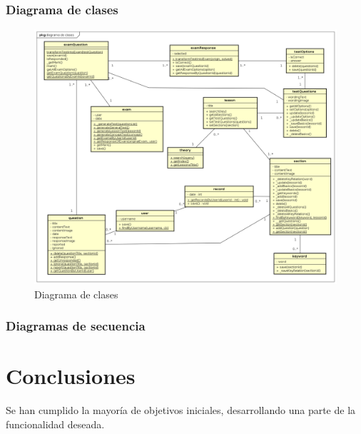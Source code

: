 \documentclass[openright,twoside,10pt]{book}
\begin{document}
    \vspace*{\fill} \newpage
    
    \subsection{Diagrama de clases}\label{diagrama-de-clases}
    
    \vspace*{\fill}
    
    \begin{figure}[H]
        \begin{center}
            \includegraphics[width=\textwidth, angle=-90]{img/astah/disenio/clases/clases.png}
        \end{center}
        \caption{Diagrama de clases}
    \end{figure}
    
    \vspace*{\fill} \newpage
    
    \subsection{Diagramas de secuencia}\label{diagramas-de-secuencia}
    
    \chapter{ Conclusiones }
    
    Se han cumplido la mayoría de objetivos iniciales, desarrollando una
    parte de la funcionalidad deseada.
    
\end{document}

